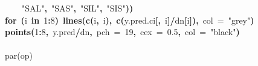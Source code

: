 \documentclass{article}
\makeatletter
\newcommand{\hlnumber}[1]{\textcolor[rgb]{0,0,0}{#1}}%
\newcommand{\hlfunctioncall}[1]{\textcolor[rgb]{.5,0,.33}{\textbf{#1}}}%
\newcommand{\hlstring}[1]{\textcolor[rgb]{.6,.6,1}{#1}}%
\newcommand{\hlkeyword}[1]{\textbf{#1}}%
\newcommand{\hlargument}[1]{\textcolor[rgb]{.69,.25,.02}{#1}}%
\newcommand{\hlcomment}[1]{\textcolor[rgb]{.18,.6,.34}{#1}}%
\newcommand{\hlsymbol}[1]{#1}%
\newcommand{\hlstd}[1]{\textcolor[rgb]{0,0,0}{#1}}%
\newenvironment{kframe}{%
 \def\FrameCommand##1{\hskip\@totalleftmargin \hskip-\fboxsep
 \colorbox{shadecolor}{##1}\hskip-\fboxsep
     \hskip-\linewidth \hskip-\@totalleftmargin \hskip\columnwidth}%
 \MakeFramed {\advance\hsize-\width
   \@totalleftmargin\z@ \linewidth\hsize
   \@setminipage}}%
 {\par\unskip\endMakeFramed}
\newenvironment{knitrout}{}{} %
\makeatother
\begin{document}
\begin{knitrout}
{\begin{kframe}
\begin{flushleft}
\hlstd{}{\ }{\ }{\ }{\ }\hlstring{"{}SAL"{}}\hlkeyword{,}{\ }\hlstring{"{}SAS"{}}\hlkeyword{,}{\ }\hlstring{"{}SIL"{}}\hlkeyword{,}{\ }\hlstring{"{}SIS"{}}\hlkeyword{)}\hlkeyword{)}\hspace*{\fill}\\
\hlstd{}\hlkeyword{for}{\ }\hlkeyword{(}\hlsymbol{i}{\ }\hlkeyword{in}{\ }\hlnumber{1}\hlkeyword{:}\hlnumber{8}\hlkeyword{)}{\ }\hlfunctioncall{lines}\hlkeyword{(}\hlfunctioncall{c}\hlkeyword{(}\hlsymbol{i}\hlkeyword{,}{\ }\hlsymbol{i}\hlkeyword{)}\hlkeyword{,}{\ }\hlfunctioncall{c}\hlkeyword{(}\hlsymbol{y.pred.ci}\hlkeyword{[}\hlkeyword{,}{\ }\hlsymbol{i}\hlkeyword{]}\hlkeyword{/}\hlsymbol{d}\hlkeyword{\usebox{\hlnormalsizeboxdollar}}\hlsymbol{n}\hlkeyword{[}\hlsymbol{i}\hlkeyword{]}\hlkeyword{)}\hlkeyword{,}{\ }\hlargument{col}{\ }\hlargument{=}{\ }\hlstring{"{}grey"{}}\hlkeyword{)}\hspace*{\fill}\\
\hlstd{}\hlfunctioncall{points}\hlkeyword{(}\hlnumber{1}\hlkeyword{:}\hlnumber{8}\hlkeyword{,}{\ }\hlsymbol{y.pred}\hlkeyword{/}\hlsymbol{d}\hlkeyword{\usebox{\hlnormalsizeboxdollar}}\hlsymbol{n}\hlkeyword{,}{\ }\hlargument{pch}{\ }\hlargument{=}{\ }\hlnumber{19}\hlkeyword{,}{\ }\hlargument{cex}{\ }\hlargument{=}{\ }\hlnumber{0.5}\hlkeyword{,}{\ }\hlargument{col}{\ }\hlargument{=}{\ }\hlstring{"{}black"{}}\hlkeyword{)}\hspace*{\fill}\\
\hlstd{}\hspace*{\fill}\\
\hlstd{}\hlcomment{\usebox{\hlnormalsizeboxhash}par(op)}\mbox{}
\normalfont
\end{flushleft}



\end{kframe}}
\end{knitrout}
\end{document}

